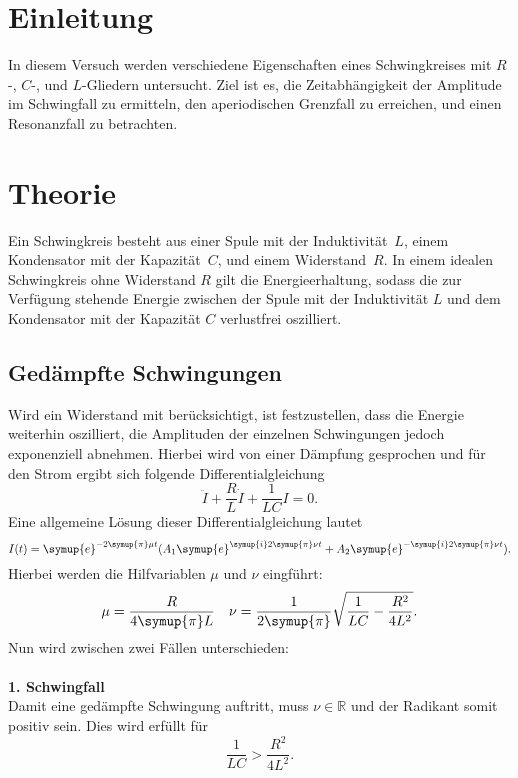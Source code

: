 \section{Einleitung}
\label{sec:Einleitung}
In diesem Versuch werden verschiedene Eigenschaften eines Schwingkreises mit $R$-, $C$-, und $L$-Gliedern untersucht. Ziel 
ist es, die Zeitabhängigkeit der Amplitude im Schwingfall zu ermitteln, den aperiodischen Grenzfall zu erreichen, und einen
Resonanzfall zu betrachten.

\section{Theorie}
\label{sec:Theorie}
Ein Schwingkreis besteht aus einer Spule mit der Induktivität~$L$, einem Kondensator mit der Kapazität~$C$, und einem 
Widerstand~$R$. In einem idealen Schwingkreis ohne Widerstand $R$ gilt die Energieerhaltung, sodass die zur Verfügung stehende 
Energie zwischen der Spule mit der Induktivität $L$ und dem Kondensator mit der Kapazität $C$ verlustfrei oszilliert.

\subsection{Gedämpfte Schwingungen}
Wird ein Widerstand mit berücksichtigt, ist festzustellen, dass die Energie weiterhin oszilliert, die Amplituden der einzelnen 
Schwingungen jedoch exponenziell abnehmen. Hierbei wird von einer Dämpfung gesprochen und für den Strom ergibt sich folgende 
Differentialgleichung
\begin{equation*}
    \ddot{I}+\frac{R}{L}\dot{I}+\frac{1}{LC}I=0.
\end{equation*}
Eine allgemeine Lösung dieser Differentialgleichung lautet
\begin{equation}
    I(t) = \symup{e}^{-2\symup{\pi}\mu t} (A_{1}\symup{e}^{\symup{i}2\symup{\pi}\nu t} + A_{2}\symup{e}^{-\symup{i}2\symup{\pi}\nu t}).
    \label{eq:DGL fuer I komplex}
\end{equation}
Hierbei werden die Hilfvariablen $\mu$ und $\nu$ eingführt:
\begin{align*}
    \mu &= \frac{R}{4\symup{\pi}L} & \nu = \frac{1}{2\symup{\pi}}\sqrt{\frac{1}{LC}-\frac{R^{2}}{4L^{2}}}.
\end{align*}
Nun wird zwischen zwei Fällen unterschieden:
\\
\\
\textbf{1. Schwingfall} \\
Damit eine gedämpfte Schwingung auftritt, muss $\nu \in \mathbb{R}$ und der Radikant somit positiv sein. Dies wird erfüllt für
\begin{equation*}
    \frac{1}{LC} > \frac{R^{2}}{4L^{2}}.
\end{equation*}

